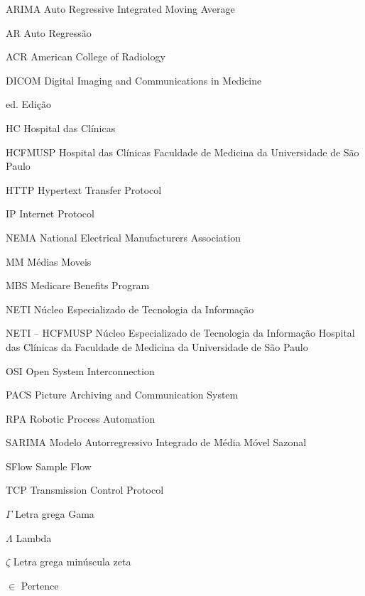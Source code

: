 \documentclass[
	12pt,				%
	openright,			%
	twoside,			%
	a4paper,			%
	english,			%
	french,				%
	spanish,			%
	brazil				%
	]{abntex2}
\begin{document}
\begin{siglas}
  \item[ARIMA] Auto Regressive Integrated Moving Average
\item[AR] Auto Regressão
\item[ACR] American College of Radiology
\item[DICOM] Digital Imaging and Communications in Medicine
\item[ed.] Edição
\item[HC] Hospital das Clínicas
\item[HCFMUSP] Hospital das Clínicas Faculdade de Medicina da Universidade de São Paulo
\item[HTTP] Hypertext Transfer Protocol 
\item[IP] Internet Protocol
\item[NEMA] National Electrical Manufacturers Association
\item[MM] Médias Moveis
\item[MBS] Medicare Benefits Program
\item[NETI] Núcleo Especializado de Tecnologia da Informação
\item[NETI – HCFMUSP] Núcleo Especializado de Tecnologia da Informação Hospital das Clínicas da Faculdade de Medicina da Universidade de São Paulo
\item[OSI] Open System Interconnection
\item[PACS] Picture Archiving and Communication System
\item[RPA] Robotic Process Automation
\item[SARIMA] Modelo Autorregressivo Integrado de Média Móvel Sazonal
\item[SFlow] Sample Flow
\item[TCP] Transmission Control Protocol
\end{siglas}

\begin{simbolos}
  \item[$ \Gamma $] Letra grega Gama
  \item[$ \Lambda $] Lambda
  \item[$ \zeta $] Letra grega minúscula zeta
  \item[$ \in $] Pertence
\end{simbolos}

\tableofcontents*
\cleardoublepage
\end{document}
